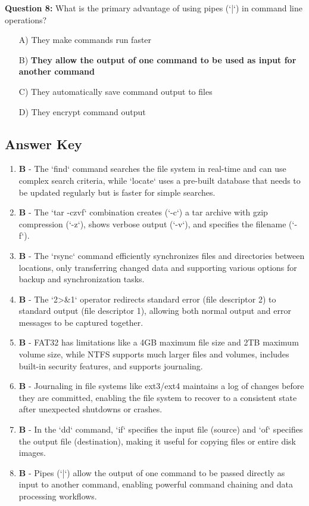 \textbf{Question 8:} What is the primary advantage of using pipes (`|`) in command line operations?

\begin{enumerate}
    \item[A)] They make commands run faster
    \item[B)] \textbf{They allow the output of one command to be used as input for another command}
    \item[C)] They automatically save command output to files
    \item[D)] They encrypt command output
\end{enumerate}

\subsection{Answer Key}

\begin{enumerate}
    \item \textbf{B} - The `find` command searches the file system in real-time and can use complex search criteria, while `locate` uses a pre-built database that needs to be updated regularly but is faster for simple searches.
    
    \item \textbf{B} - The `tar -czvf` combination creates (`-c`) a tar archive with gzip compression (`-z`), shows verbose output (`-v`), and specifies the filename (`-f`).
    
    \item \textbf{B} - The `rsync` command efficiently synchronizes files and directories between locations, only transferring changed data and supporting various options for backup and synchronization tasks.
    
    \item \textbf{B} - The `2>\&1` operator redirects standard error (file descriptor 2) to standard output (file descriptor 1), allowing both normal output and error messages to be captured together.
    
    \item \textbf{B} - FAT32 has limitations like a 4GB maximum file size and 2TB maximum volume size, while NTFS supports much larger files and volumes, includes built-in security features, and supports journaling.
    
    \item \textbf{B} - Journaling in file systems like ext3/ext4 maintains a log of changes before they are committed, enabling the file system to recover to a consistent state after unexpected shutdowns or crashes.
    
    \item \textbf{B} - In the `dd` command, `if` specifies the input file (source) and `of` specifies the output file (destination), making it useful for copying files or entire disk images.
    
    \item \textbf{B} - Pipes (`|`) allow the output of one command to be passed directly as input to another command, enabling powerful command chaining and data processing workflows.
\end{enumerate}
